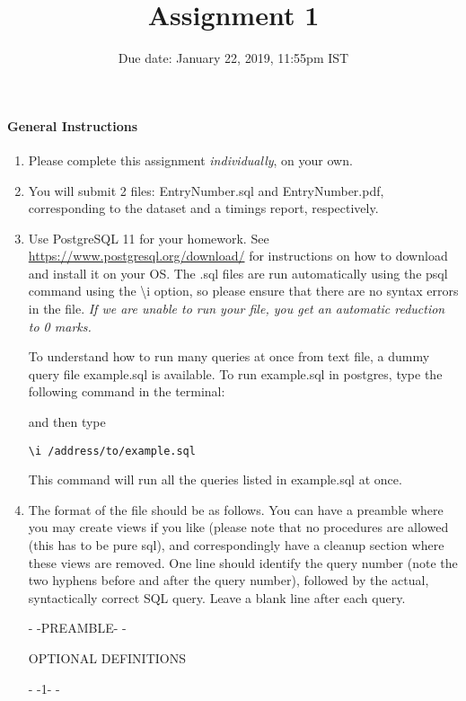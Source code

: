 \documentclass[10pt]{article}
\title{Assignment 1}
\date{Due date: January 22, 2019, 11:55pm IST}
\begin{document}
\maketitle
\paragraph*{General Instructions}


\begin{enumerate}
	
\item Please complete this assignment \emph{individually}, on your own.

\item You will submit 2 files: EntryNumber.sql and EntryNumber.pdf, corresponding to the dataset and a timings report, respectively.

\item Use PostgreSQL 11 for your homework. See \url{https://www.postgresql.org/download/} for instructions
on how to download and install it on your OS. The .sql files are run automatically using the psql command using the \textbackslash i option, so please ensure that there are no syntax errors in the file. {\it If we are unable to run your file, you get an automatic reduction to 0 marks.}


To understand how to run many queries at once from text file, a dummy query file example.sql is available. To run example.sql in postgres, type the following command in the terminal:


and then type 

{\tt \textbackslash i /address/to/example.sql}

This command will run all the queries listed in example.sql at once.  

\item The format of the file should be as follows. You can have a preamble where you may create views if you like (please note that no procedures are allowed (this has to be pure sql), and correspondingly have a cleanup section where these views are removed. One line should identify the query number (note the two hyphens before and after the query number), followed by the actual, syntactically correct SQL query. Leave a blank line after each query. 

- -PREAMBLE- -

OPTIONAL DEFINITIONS

- -1- -


\end{enumerate}
\end{document}
